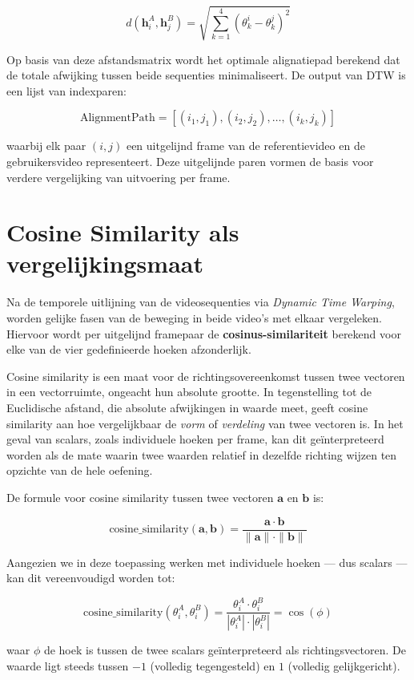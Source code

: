 \[
d(\mathbf{h}_i^A, \mathbf{h}_j^B) = \sqrt{\sum_{k=1}^4 (\theta_k^i - \theta_k^j)^2}
\]

Op basis van deze afstandsmatrix wordt het optimale alignatiepad berekend dat de totale afwijking tussen beide sequenties minimaliseert. 
De output van DTW is een lijst van indexparen:

\[
\text{AlignmentPath} = [(i_1, j_1), (i_2, j_2), \dots, (i_k, j_k)]
\]

waarbij elk paar $(i, j)$ een uitgelijnd frame van de referentievideo en de gebruikersvideo representeert. 
Deze uitgelijnde paren vormen de basis voor verdere vergelijking van uitvoering per frame.

\section{Cosine Similarity als vergelijkingsmaat}
Na de temporele uitlijning van de videosequenties via \textit{Dynamic Time Warping}, worden gelijke fasen van de beweging in beide video's met elkaar vergeleken. 
Hiervoor wordt per uitgelijnd framepaar de \textbf{cosinus-similariteit} berekend voor elke van de vier gedefinieerde hoeken afzonderlijk.

Cosine similarity is een maat voor de richtingsovereenkomst tussen twee vectoren in een vectorruimte, ongeacht hun absolute grootte. 
In tegenstelling tot de Euclidische afstand, die absolute afwijkingen in waarde meet, geeft cosine similarity aan hoe vergelijkbaar de \textit{vorm} of \textit{verdeling} van twee vectoren is. 
In het geval van scalars, zoals individuele hoeken per frame, kan dit geïnterpreteerd worden als de mate waarin twee waarden relatief in dezelfde richting wijzen ten opzichte van de hele oefening.

De formule voor cosine similarity tussen twee vectoren $\mathbf{a}$ en $\mathbf{b}$ is:

\[
\text{cosine\_similarity}(\mathbf{a}, \mathbf{b}) = \frac{\mathbf{a} \cdot \mathbf{b}}{\|\mathbf{a}\| \cdot \|\mathbf{b}\|}
\]

Aangezien we in deze toepassing werken met individuele hoeken — dus scalars — kan dit vereenvoudigd worden tot:

\[
\text{cosine\_similarity}(\theta_i^A, \theta_i^B) = \frac{\theta_i^A \cdot \theta_i^B}{|\theta_i^A| \cdot |\theta_i^B|} = \cos(\phi)
\]

waar $\phi$ de hoek is tussen de twee scalars geïnterpreteerd als richtingsvectoren. 
De waarde ligt steeds tussen $-1$ (volledig tegengesteld) en $1$ (volledig gelijkgericht).

